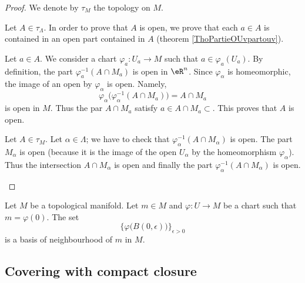 \begin{proof}
	We denote by \( \tau_M\) the topology on \( M\).
	\begin{subproof}
		Let \( A\in \tau_{\Lambda}\). In order to prove that \( A\) is open, we prove that each \( a\in A\) is contained in an open part contained in \( A\) (theorem \ref{ThoPartieOUvpartouv}).

		Let \( a\in A\). We consider a chart \(\varphi_a \colon U_a\to M  \) such that \( a\in\varphi_a(U_a)\). By definition, the part \( \varphi_a^{-1}(A\cap M_a)\) is open in \( \eR^n\). Since \( \varphi_{\alpha}\) is homeomorphic, the image of an open by \( \varphi_{\alpha}\) is open. Namely,
		\begin{equation}
			\varphi_{\alpha}\Big( \varphi_{\alpha}^{-1}(A\cap M_a) \Big)=A\cap M_a
		\end{equation}
		is open in \( M\). Thus the par \( A\cap M_a\) satisfy \( a\in A\cap M_a\subset\). This proves that \( A\) is open.

		Let \( A\in \tau_M\). Let \( \alpha\in\Lambda\); we have to check that \( \varphi_{\alpha}^{-1}(A\cap M_{\alpha})\) is open. The part \( M_{\alpha}\) is open (because it is the image of the open \( U_{\alpha}\) by the homeomorphism \( \varphi_{\alpha}\)). Thus the intersection \( A\cap M_{\alpha}\) is open and finally the part \( \varphi_{\alpha}^{-1}(A\cap M_{\alpha})\) is open.
	\end{subproof}
\end{proof}

\begin{proposition}			\label{PROPooGAZZooWIPVuf}
	Let \( M\) be a topological manifold. Let \( m\in M\) and \(\varphi \colon U\to M  \) be a chart such that \( m=\varphi(0)\). The set
	\begin{equation}
		\{ \varphi\big( B(0,\epsilon) \big) \}_{\epsilon>0}
	\end{equation}
	is a basis of neighbourhood of \( m\) in \( M\).
\end{proposition}


\subsection{Covering with compact closure}

